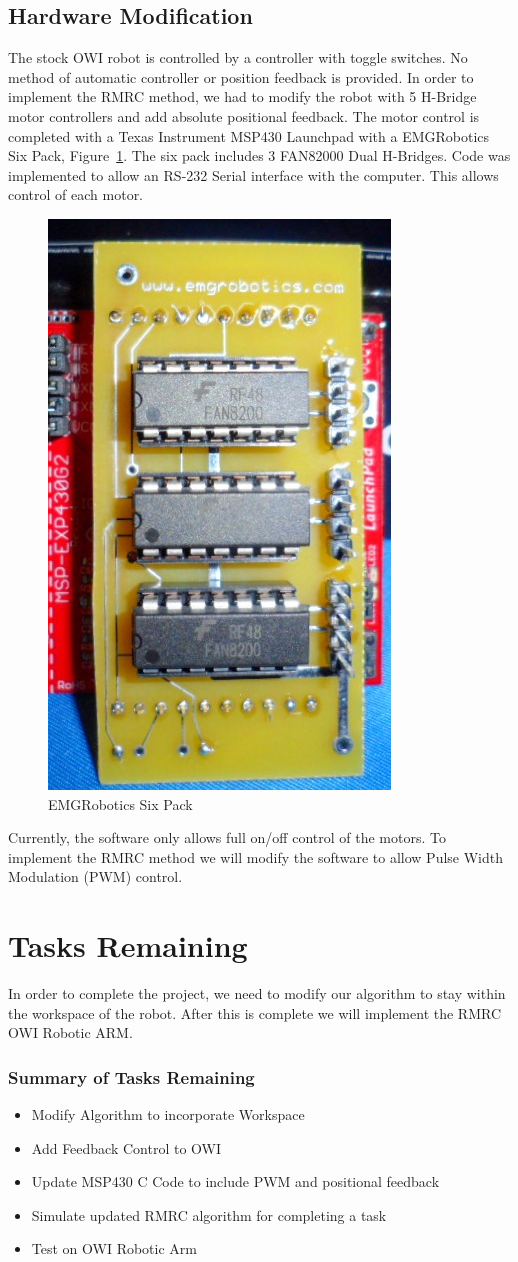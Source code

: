 \documentclass[paper=letter, fontsize=10pt]{scrartcl}	%
\numberwithin{equation}{section}															%
\numberwithin{figure}{section}																%
\numberwithin{table}{section}																%
\begin{document}
\subsection{Hardware Modification}
The stock OWI robot is controlled by a controller with toggle switches. No method of automatic controller or position feedback is provided. In order to implement the RMRC method, we had to modify the robot with 5 H-Bridge motor controllers and add absolute positional feedback. 
The motor control is completed with a Texas Instrument MSP430 Launchpad with a EMGRobotics Six Pack, Figure~\ref{fig:SixPackV1}. The six pack includes 3 FAN82000 Dual H-Bridges. Code was implemented to allow an RS-232 Serial interface with the computer. This allows control of each motor.
\begin{figure}[!h]
  \centering
    \includegraphics[width=.4\textwidth, angle=90]{./Images/SixPackV1}
    \caption{EMGRobotics Six Pack}
    \label{fig:SixPackV1}
\end{figure}
Currently, the software only allows full on/off control of the motors. To implement the RMRC method we will modify the software to allow Pulse Width Modulation (PWM) control.

\section{Tasks Remaining}
In order to complete the project, we need to modify our algorithm to stay within the workspace of the robot. After this is complete we will implement the RMRC OWI Robotic ARM.
\subsubsection{Summary of Tasks Remaining}
\begin{itemize}
	\item Modify Algorithm to incorporate Workspace 
	\item Add Feedback Control to OWI
	\item Update MSP430 C Code to include PWM and positional feedback
	\item Simulate updated RMRC algorithm for completing a task
	\item Test on OWI Robotic Arm
\end{itemize}
\end{document}
